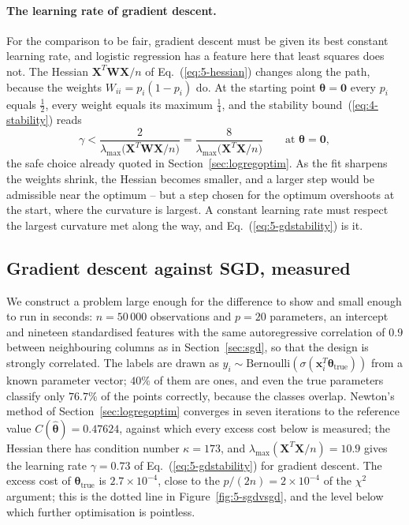 \paragraph{The learning rate of gradient descent.}
For the comparison to be fair, gradient descent must be given its best
constant learning rate, and logistic regression has a feature here that
least squares does not.  The Hessian $\bm{X}^{T}\bm{W}\bm{X}/n$ of
Eq.~(\ref{eq:5-hessian}) changes along the path, because the weights
$W_{ii}=p_i(1-p_i)$ do.  At the starting point $\bm{\theta}=\bm{0}$ every
$p_i$ equals $\tfrac12$, every weight equals its maximum $\tfrac14$, and
the stability bound~(\ref{eq:4-stability}) reads
\begin{equation}
  \gamma < \frac{2}{\lambda_{\max}\bigl(\bm{X}^{T}\bm{W}\bm{X}/n\bigr)}
   = \frac{8}{\lambda_{\max}\bigl(\bm{X}^{T}\bm{X}/n\bigr)}
  \qquad\text{at }\bm{\theta}=\bm{0},
  \label{eq:5-gdstability}
\end{equation}
the safe choice already quoted in Section~\ref{sec:logregoptim}.  As the
fit sharpens the weights shrink, the Hessian becomes smaller, and a larger
step would be admissible near the optimum -- but a step chosen for the
optimum overshoots at the start, where the curvature is largest.  A
constant learning rate must respect the largest curvature met along the
way, and Eq.~(\ref{eq:5-gdstability}) is it.

\subsection{Gradient descent against SGD, measured}
\label{sec:logregsgdvsgd}

We construct a problem large enough for the difference to show and small
enough to run in seconds: $n=50\,000$ observations and $p=20$ parameters,
an intercept and nineteen standardised features with the same
autoregressive correlation of $0.9$ between neighbouring columns as in
Section~\ref{sec:sgd}, so that the design is strongly correlated.  The
labels are drawn as $y_i\sim\mathrm{Bernoulli}(\sigma(\bm{x}_i^{T}
\bm{\theta}_{\mathrm{true}}))$ from a known parameter vector; $40\%$ of
them are ones, and even the true parameters classify only $76.7\%$ of the
points correctly, because the classes overlap.  Newton's method of
Section~\ref{sec:logregoptim} converges in seven iterations to the reference
value $C(\hat{\bm{\theta}})=0.47624$, against which every excess cost below
is measured; the Hessian there has condition number $\kappa=173$, and
$\lambda_{\max}(\bm{X}^{T}\bm{X}/n)=10.9$ gives the learning rate
$\gamma=0.73$ of Eq.~(\ref{eq:5-gdstability}) for gradient descent.  The
excess cost of $\bm{\theta}_{\mathrm{true}}$ is $2.7\times10^{-4}$, close
to the $p/(2n)=2\times10^{-4}$ of the $\chi^{2}$ argument; this is the
dotted line in Figure~\ref{fig:5-sgdvsgd}, and the level below which
further optimisation is pointless.

